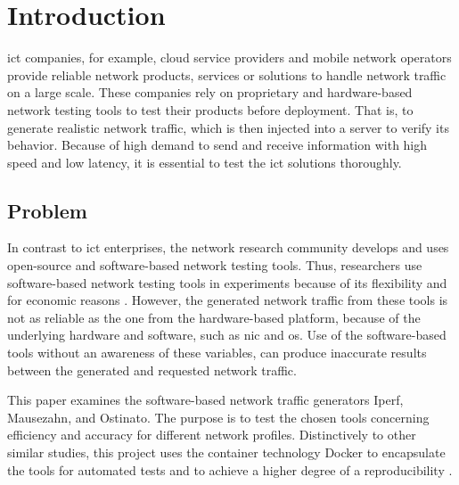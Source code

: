 \chapter{Introduction}\label{introduction}

\acrfull{ict} companies, for example, cloud service providers and mobile network operators provide reliable network products, services or solutions to handle network traffic on a large scale.
These companies rely on proprietary and hardware-based network testing tools to test their products before deployment.
That is, to generate realistic network traffic, which is then injected into a server to verify its behavior.
Because of high demand to send and receive information with high speed and low latency, it is essential to test the \gls{ict} solutions thoroughly.

%
%
\section{Problem}

In contrast to \gls{ict} enterprises, the network research community develops and uses open-source and software-based network testing tools.
Thus, researchers use software-based network testing tools \cite{DITGDist48:online, Packetge32:online, ToolsThe22:online} in experiments because of its flexibility and for economic reasons \cite{botta2010you, molnar2013validate}.
However, the generated network traffic from these tools is not as reliable as the one from the hardware-based platform, because of the underlying hardware and software, such as \gls{nic} and \gls{os}.
Use of the software-based tools without an awareness of these variables, can produce inaccurate results between the generated and requested network traffic.

\skippara This paper examines the software-based network traffic generators Iperf, Mausezahn, and Ostinato.
The purpose is to test the chosen tools concerning efficiency and accuracy for different network profiles.
Distinctively to other similar studies, this project uses the container technology Docker to encapsulate the tools for automated tests and to achieve a higher degree of a reproducibility \cite{piccolo2016tools, boettiger2015introduction, Chamberlain2014}.

%
%
